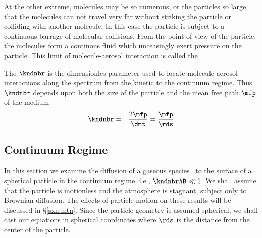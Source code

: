 \documentclass[12pt,twoside]{book}
\begin{document}
At the other extreme, molecules may be so numerous, or the particles
so large, that the molecules can not travel very far without striking
the particle or colliding with another molecule. 
In this case the particle is subject to a continuous barrage of
molecular collisions. 
From the point of view of the particle, the molecules form a continous
fluid which unceasingly exert pressure on the particle.
This limit of molecule-aerosol interaction is called the
.

The  $\kndnbr$ is the dimensionles parameter
used to locate molecule-aerosol interactions along the spectrum from
the kinetic to the continuum regime.
Thus $\kndnbr$ depends upon both the size of the particle and the 
mean free path $\mfp$ of the medium
\begin{eqnarray}
\kndnbr & = & \frac{2 \mfp}{\dmt } = \frac{\mfp}{\rds }
\label{eqn:knd_nbr_dfn}
\end{eqnarray}

\subsection[Continuum Regime]{Continuum Regime}\label{sxn:cnt}
In this section we examine the diffusion of a gaseous species \A\ to
the surface of a spherical particle in the continuum regime, i.e.,
$\kndnbrAB \ll 1$.
We shall assume that the particle is motionless and the atmosphere is
stagnant, subject only to Brownian diffusion.
The effects of particle motion on these results will be discussed in 
\S\ref{sxn:mtn}. 
Since the particle geometry is assumed spherical, we shall cast our
equations in spherical coordinates where $\rds$ is the distance from
the center of the particle.
\end{document}
